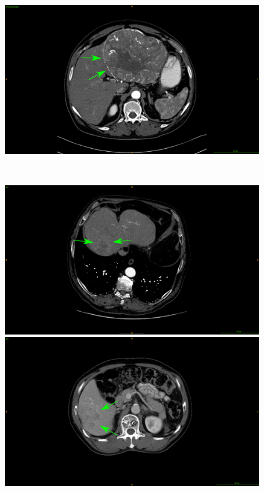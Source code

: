\documentclass[]{article}
\begin{document}
\begin{figure}[!ht]
\begin{minipage}{0.45\linewidth}
	\end{minipage} \hspace{-0.1cm}
	\begin{minipage}{0.45\linewidth}
		\includegraphics[width=\linewidth]{../Contributions/images/ImagingTraits/ResizeTCIA_smoothMargins}
	\end{minipage} \\
	\begin{minipage}{0.45\linewidth}
		\includegraphics[width=\linewidth]{../Contributions/images/ImagingTraits/ResizeGDB_nonSmoothMargins}
	\end{minipage} \hspace{-0.1cm}
	\begin{minipage}{0.45\linewidth}
		\includegraphics[width=\linewidth]{../Contributions/images/ImagingTraits/ResizeTCIA_nonSmoothMargins}

\end{minipage}
\end{figure}
\end{document}
